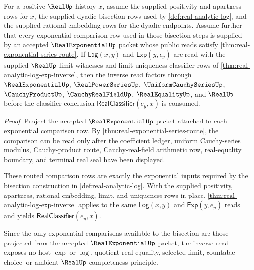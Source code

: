 \begin{theorem}\label{thm:real-analytic-log-real-exponential-handoff}
For a positive $\RealUp$-history $x$, assume the supplied positivity and apartness rows for $x$, the supplied dyadic bisection rows used by \autoref{def:real-analytic-log}, and the supplied rational-embedding rows for the dyadic endpoints. Assume further that every exponential comparison row used in those bisection steps is supplied by an accepted $\RealExponentialUp$ packet whose public reads satisfy \autoref{thm:real-exponential-series-route}. If $\mathsf{Log}(x,y)$ and $\mathsf{Exp}(y,e_y)$ are read with the supplied $\RealUp$ limit witnesses and limit-uniqueness classifier rows of \autoref{thm:real-analytic-log-exp-inverse}, then the inverse read factors through $\RealExponentialUp$, $\RealPowerSeriesUp$, $\UniformCauchySeriesUp$, $\CauchyProductUp$, $\CauchyRealFieldUp$, $\RealEqualityUp$, and $\RealUp$ before the classifier conclusion $\mathsf{RealClassifier}(e_y,x)$ is consumed.
\end{theorem}
\begin{proof}
Project the accepted $\RealExponentialUp$ packet attached to each exponential comparison row. By \autoref{thm:real-exponential-series-route}, the comparison can be read only after the coefficient ledger, uniform Cauchy-series modulus, Cauchy-product route, Cauchy-real-field arithmetic row, real-equality boundary, and terminal real seal have been displayed.

These routed comparison rows are exactly the exponential inputs required by the bisection construction in \autoref{def:real-analytic-log}. With the supplied positivity, apartness, rational-embedding, limit, and uniqueness rows in place, \autoref{thm:real-analytic-log-exp-inverse} applies to the same $\mathsf{Log}(x,y)$ and $\mathsf{Exp}(y,e_y)$ reads and yields $\mathsf{RealClassifier}(e_y,x)$.

Since the only exponential comparisons available to the bisection are those projected from the accepted $\RealExponentialUp$ packet, the inverse read exposes no host $\exp$ or $\log$, quotient real equality, selected limit, countable choice, or ambient $\RealUp$ completeness principle.
\end{proof}

